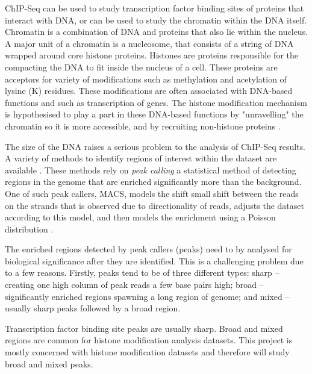 \documentclass[12pt,a4paper]{article}
\begin{document}
ChIP-Seq can be used to study transcription factor binding sites of proteins
that interact with DNA, or can be used to study the chromatin within the DNA
itself. Chromatin is a combination of DNA and proteins that also lie within the
nucleus.  A major unit of a chromatin is a nucleosome, that consists of a
string of DNA wrapped around core histone proteins.  Histones are proteins
responsible for the compacting the DNA to fit inside the nucleus of a cell.
These proteins are acceptors for variety of modifications such as methylation
and acetylation of lysine (K) residues\cite{Fischle:2003tl}. These modifications
are often associated with DNA-based functions and such as transcription of
genes.  The histone modification mechanism is hypothesised to play a part in
these DNA-based functions by  "unravelling" the chromatin so it is more
accessible, and by recruiting non-histone proteins \cite{Kouzarides:2007ui}.

The size of the DNA raises a serious problem to the analysis of ChIP-Seq
results.  A variety of methods to identify regions of interest within the
dataset are available \cite{Park:2009wc}. These methods rely on \emph{peak
    calling} a statistical method of detecting regions in the genome that are
enriched significantly more than the background. One of such peak callers,
MACS, models the shift small shift between the reads on the strands that is
observed due to directionality of reads, adjusts the dataset according to this
model, and then models the  enrichment using a Poisson distribution
\cite{Zhang:2008wp}.

The enriched regions detected by peak callers (peaks) need to by analysed for
biological significance after they are identified. This is a challenging
problem due to a few reasons. Firstly, peaks tend to be of three different
types: sharp -- creating one high column of peak reads a few base pairs high;
broad -- significantly enriched regions spawning a long region of genome; and
mixed -- usually sharp peaks followed by a broad region\cite{Park:2009wc}.

Transcription factor binding site peaks are usually sharp. Broad and mixed
regions are common for histone modification analysis datasets. This project is mostly concerned
with histone modification datasets and therefore will study broad and mixed peaks.
\end{document}
